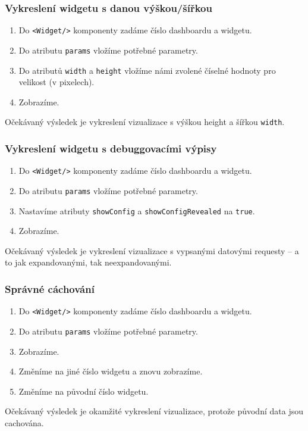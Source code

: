 \documentclass[czech, bc, kiv, he, iso690numb]{fasthesis}
\begin{document}
\subsubsection{Vykreslení widgetu s danou výškou/šířkou}
\begin{enumerate}
	\item Do \texttt{<Widget/>} komponenty zadáme číslo dashboardu a widgetu.
	\item Do atributu \texttt{params} vložíme potřebné parametry.
	\item Do atributů \texttt{width} a \texttt{height} vložíme námi zvolené číselné hodnoty pro velikost (v pixelech).
	\item Zobrazíme.
\end{enumerate}
Očekávaný výsledek je vykreslení vizualizace s výškou {height} a šířkou \texttt{width}.

\subsubsection{Vykreslení widgetu s debuggovacími výpisy}
\begin{enumerate}
	\item Do \texttt{<Widget/>} komponenty zadáme číslo dashboardu a widgetu.
	\item Do atributu \texttt{params} vložíme potřebné parametry.
	\item Nastavíme atributy \texttt{showConfig} a \texttt{showConfigRevealed} na \texttt{true}.
	\item Zobrazíme.
\end{enumerate}
Očekávaný výsledek je vykreslení vizualizace s vypsanými datovými requesty – a to jak expandovanými, tak neexpandovanými.

\subsubsection{Správné cáchování}
\begin{enumerate}
	\item Do \texttt{<Widget/>} komponenty zadáme číslo dashboardu a widgetu.
	\item Do atributu \texttt{params} vložíme potřebné parametry.
	\item Zobrazíme.
	\item Změníme na jiné číslo widgetu a znovu zobrazíme.
	\item Změníme na původní číslo widgetu.
\end{enumerate}
Očekávaný výsledek je okamžité vykreslení vizualizace, protože původní data jsou cachována.
\end{document}
